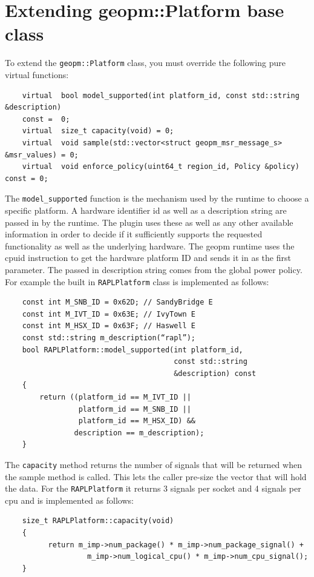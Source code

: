 \documentclass[11pt]{article}
\begin{document}
\section{Extending geopm::Platform base class}
To extend the \verb#geopm::Platform# class, you must override the
following pure virtual functions:
\begin{verbatim}
    virtual  bool model_supported(int platform_id, const std::string &description)
    const =  0;
    virtual  size_t capacity(void) = 0;
    virtual  void sample(std::vector<struct geopm_msr_message_s> &msr_values) = 0;
    virtual  void enforce_policy(uint64_t region_id, Policy &policy) const = 0;
\end{verbatim}
The \verb#model_supported# function is the mechanism used by the
runtime to choose a specific platform. A hardware identifier id as
well as a description string are passed in by the runtime.  The plugin
uses these as well as any other available information in order to
decide if it sufficiently supports the requested functionality as well
as the underlying hardware. The geopm runtime uses the cpuid
instruction to get the hardware platform ID and sends it in as the
first parameter. The passed in description string comes from the
global power policy. For example the built in \verb#RAPLPlatform#
class is implemented as follows:
\begin{verbatim}
    const int M_SNB_ID = 0x62D; // SandyBridge E
    const int M_IVT_ID = 0x63E; // IvyTown E
    const int M_HSX_ID = 0x63F; // Haswell E
    const std::string m_description(“rapl”);
    bool RAPLPlatform::model_supported(int platform_id,
                                       const std::string
                                       &description) const
    {
        return ((platform_id == M_IVT_ID ||
                 platform_id == M_SNB_ID ||
                 platform_id == M_HSX_ID) &&
                description == m_description);
    }
\end{verbatim}
The \verb#capacity# method returns the number of signals that will be
returned when the sample method is called. This lets the caller
pre-size the vector that will hold the data. For the
\verb#RAPLPlatform# it returns 3 signals per socket and 4 signals per
cpu and is implemented as follows:
\begin{verbatim}
    size_t RAPLPlatform::capacity(void)
    {
          return m_imp->num_package() * m_imp->num_package_signal() +
                   m_imp->num_logical_cpu() * m_imp->num_cpu_signal();
    }
\end{verbatim}
\end{document}
